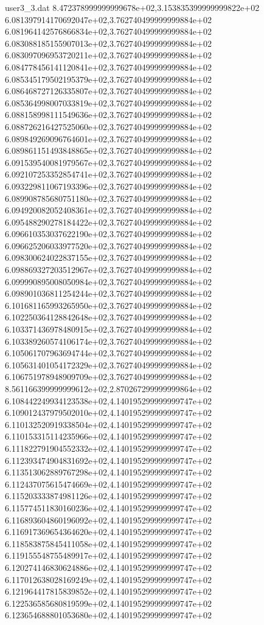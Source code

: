 \begin{filecontents}{user3_3.dat}
8.472378999999999678e+02,3.153835399999999822e+02
6.081397914170692047e+02,3.762740499999999884e+02
6.081964142576866834e+02,3.762740499999999884e+02
6.083088185155907013e+02,3.762740499999999884e+02
6.083097096953720211e+02,3.762740499999999884e+02
6.084778456141120841e+02,3.762740499999999884e+02
6.085345179502195379e+02,3.762740499999999884e+02
6.086468727126335807e+02,3.762740499999999884e+02
6.085364998007033819e+02,3.762740499999999884e+02
6.088158998111549636e+02,3.762740499999999884e+02
6.088726216427525060e+02,3.762740499999999884e+02
6.089849269096764601e+02,3.762740499999999884e+02
6.089861151493848865e+02,3.762740499999999884e+02
6.091539540081979567e+02,3.762740499999999884e+02
6.092107253352854741e+02,3.762740499999999884e+02
6.093229811067193396e+02,3.762740499999999884e+02
6.089908785680751180e+02,3.762740499999999884e+02
6.094920082052408361e+02,3.762740499999999884e+02
6.095488290278184422e+02,3.762740499999999884e+02
6.096610353037622190e+02,3.762740499999999884e+02
6.096625206033977520e+02,3.762740499999999884e+02
6.098300624022837155e+02,3.762740499999999884e+02
6.098869327203512967e+02,3.762740499999999884e+02
6.099990895008050984e+02,3.762740499999999884e+02
6.098901036811254244e+02,3.762740499999999884e+02
6.101681165993265950e+02,3.762740499999999884e+02
6.102250364128842648e+02,3.762740499999999884e+02
6.103371436978480915e+02,3.762740499999999884e+02
6.103389260574106174e+02,3.762740499999999884e+02
6.105061707963694744e+02,3.762740499999999884e+02
6.105631401054172329e+02,3.762740499999999884e+02
6.106751978948909709e+02,3.762740499999999884e+02
8.561166399999999612e+02,2.870267299999999864e+02
6.108442249934123538e+02,4.140195299999999747e+02
6.109012437979502010e+02,4.140195299999999747e+02
6.110132520919338504e+02,4.140195299999999747e+02
6.110153315114235966e+02,4.140195299999999747e+02
6.111822791904552332e+02,4.140195299999999747e+02
6.112393474904831692e+02,4.140195299999999747e+02
6.113513062889767298e+02,4.140195299999999747e+02
6.112437075615474669e+02,4.140195299999999747e+02
6.115203333874981126e+02,4.140195299999999747e+02
6.115774511830160236e+02,4.140195299999999747e+02
6.116893604860196092e+02,4.140195299999999747e+02
6.116917369654364620e+02,4.140195299999999747e+02
6.118583875845411058e+02,4.140195299999999747e+02
6.119155548755489917e+02,4.140195299999999747e+02
6.120274146830624886e+02,4.140195299999999747e+02
6.117012638028169249e+02,4.140195299999999747e+02
6.121964417815839852e+02,4.140195299999999747e+02
6.122536585680819599e+02,4.140195299999999747e+02
6.123654688801053680e+02,4.140195299999999747e+02

\end{filecontents}
